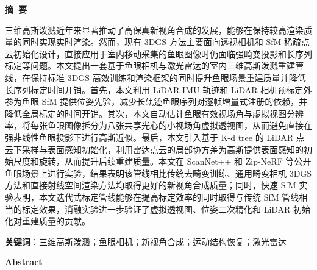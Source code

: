 \cleardoublepage{}
\begin{center}
    \bfseries {} 摘~要
\end{center}

三维高斯泼溅近年来显著推动了高保真新视角合成的发展，能够在保持较高渲染质量的同时实现实时渲染。然而，现有 3DGS 方法主要面向透视相机和 SfM 稀疏点云初始化设计，直接应用于室内移动采集的鱼眼图像时仍面临强畸变投影和长序列标定等问题。本文提出一套基于鱼眼相机与激光雷达的室内三维高斯泼溅重建管线，在保持标准 3DGS 高效训练和渲染框架的同时提升鱼眼场景重建质量并降低长序列标定时间开销。首先，本文利用 LiDAR-IMU 轨迹和 LiDAR-相机预标定外参为鱼眼 SfM 提供位姿先验，减少长轨迹鱼眼序列对逐帧增量式注册的依赖，并降低全局标定的时间开销。其次，本文自动估计鱼眼有效视场角与虚拟视图分辨率，将每张鱼眼图像拆分为八张共享光心的小视场角虚拟透视图，从而避免直接在强非线性鱼眼投影下进行高斯近似。最后，本文引入基于 K-d tree 的 LiDAR 点云下采样与表面感知初始化，利用雷达点云的局部协方差为高斯提供表面感知的初始尺度和旋转，从而提升后续重建质量。本文在 ScanNet++ 和 Zip-NeRF 等公开鱼眼场景上进行实验，结果表明该管线相比传统去畸变训练、通用畸变相机 3DGS 方法和直接射线空间渲染方法均取得更好的新视角合成质量；同时，快速 SfM 实验表明，本文迭代式标定管线能够在提高标定效率的同时取得与传统 SfM 管线相当的标定效果，消融实验进一步验证了虚拟透视图、位姿二次精化和 LiDAR 初始化对重建质量的贡献。

\smallskip
\noindent \textbf{关键词}：三维高斯泼溅；鱼眼相机；新视角合成；运动结构恢复；激光雷达

\cleardoublepage{}
{\centering
    \bfseries {} Abstract\par
}
\vspace{-0.05em}

